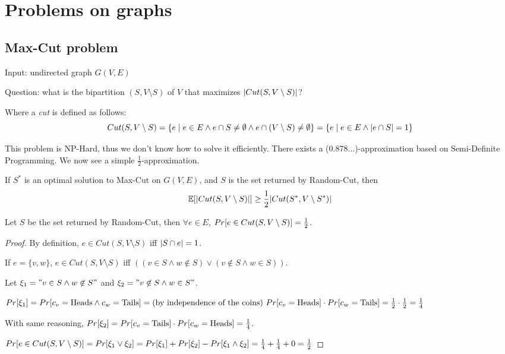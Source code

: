 \section{Problems on graphs}\label{sec:problems_graphs}

\def\cut{Cut(S, V \setminus S)}
\subsection{Max-Cut problem}\label{subsec:maxcut}
    Input: undirected graph $G(V,E)$

    Question: what is the bipartition $(S, V \setminus S)$ of $V$ that maximizes $\cardinality{\cut}$?

    Where a \textit{cut} is defined as follows:
    \[ \cut = \{ e \st e \in E \wedge e \cap S \neq \emptyset \wedge e \cap (V \setminus S) \neq \emptyset \} = \{ e \st e \in E \wedge \cardinality{e \cap S} = 1 \}\]

    This problem is NP-Hard, thus we don't know how to solve it efficiently.
    There exists a ($0.878\dots$)-approximation based on Semi-Definite Programming. We now see a simple $\frac{1}{2}$-approximation.

    


    \begin{theorem}\label{thm:randcut_approx}
        If $S^*$ is an optimal solution to Max-Cut on $G(V,E)$, and $S$ is the set returned by Random-Cut, then
        \[ \expected[ \cardinality{\cut} ] \geq \frac{1}{2} \cardinality{Cut(S^*, V \setminus S^*)} \]
    \end{theorem}

    \begin{lemma}\label{lemma:randcut_1}
        Let $S$ be the set returned by Random-Cut, then $\forall e \in E$, $\prob[ e \in \cut] = \frac{1}{2}$.
    \end{lemma}

    \begin{proof}
        By definition, $e \in \cut$ iff $\vert S \cap e \vert = 1$.

        If $e = \{ v,w \}$, $e \in \cut$ iff $( (v \in S \wedge w \not\in S) \vee (v \not\in S \wedge w \in S) )$.

        Let $\xi_1 = "v \in S \wedge w \not\in S"$ and $\xi_2 = "v \not\in S \wedge w \in S"$.

        $Pr[\xi_1] = Pr[c_v = \text{Heads} \wedge c_w = \text{Tails}] = \text{(by independence of the coins) } Pr[c_v = \text{Heads}] \cdot Pr[c_w = \text{Tails}] = \frac{1}{2} \cdot \frac{1}{2} = \frac{1}{4}$

        With same reasoning, $Pr[\xi_2] = Pr[c_v = \text{Tails}] \cdot Pr[c_w = \text{Heads}] = \frac{1}{4}$.

        $\prob[e \in \cut] = \prob[\xi_1 \vee \xi_2] = \prob[\xi_1] + \prob[\xi_2] - \prob[\xi_1 \wedge \xi_2] = \frac{1}{4} + \frac{1}{4} + 0 = \frac{1}{2}$
    \end{proof}
    
